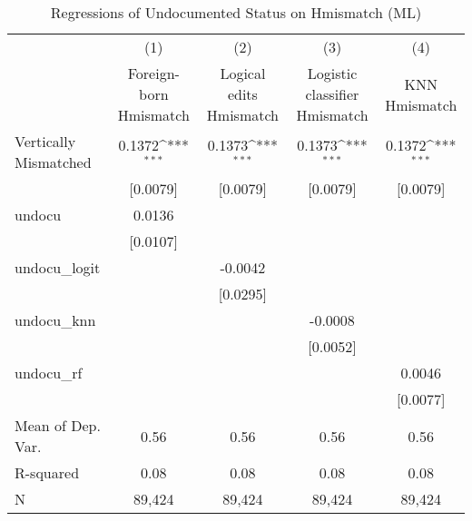 \begin{table}[htbp]\centering
\def\sym#1{\ifmmode^{#1}\else\(^{#1}\)\fi}
\caption{Regressions of Undocumented Status on Hmismatch (ML)}
\begin{tabular}{l*{4}{c}}
\toprule
                    &\multicolumn{1}{c}{(1)}         &\multicolumn{1}{c}{(2)}         &\multicolumn{1}{c}{(3)}         &\multicolumn{1}{c}{(4)}         \\
                    &Foreign-born Hmismatch         &Logical edits Hmismatch         &Logistic classifier Hmismatch         &KNN Hmismatch         \\
\midrule
Vertically Mismatched&      0.1372\sym{***}&      0.1373\sym{***}&      0.1373\sym{***}&      0.1372\sym{***}\\
                    &    [0.0079]         &    [0.0079]         &    [0.0079]         &    [0.0079]         \\
\addlinespace
undocu              &      0.0136         &                     &                     &                     \\
                    &    [0.0107]         &                     &                     &                     \\
\addlinespace
undocu\_logit        &                     &     -0.0042         &                     &                     \\
                    &                     &    [0.0295]         &                     &                     \\
\addlinespace
undocu\_knn          &                     &                     &     -0.0008         &                     \\
                    &                     &                     &    [0.0052]         &                     \\
\addlinespace
undocu\_rf           &                     &                     &                     &      0.0046         \\
                    &                     &                     &                     &    [0.0077]         \\
\midrule
Mean of Dep. Var.   &        0.56         &        0.56         &        0.56         &        0.56         \\
R-squared           &        0.08         &        0.08         &        0.08         &        0.08         \\
N                   &      89,424         &      89,424         &      89,424         &      89,424         \\

\end{tabular}
\end{table}
